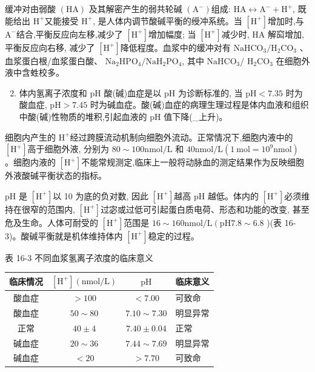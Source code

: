 \documentclass[10pt]{article}
\begin{document}
缓冲对由弱酸 $(\mathrm{HA})$ 及其解密产生的弱共轮碱 $\left(\mathrm{A}^{-}\right)$组成: $\mathrm{HA} \leftrightarrow \mathrm{A}^{-}+\mathrm{H}^{+}$, 既能给出 $\mathrm{H}^{+}$又能接受 $\mathrm{H}^{+}$, 是人体内调节酸碱平衡的绶冲系统。当 $\left[\mathrm{H}^{+}\right]$增加时,与 $\mathrm{A}^{-}$结合,平衡反应向左移,减少了 $\left[\mathrm{H}^{+}\right]$增加幅度; 当 $\left[\mathrm{H}^{+}\right]$减少时, $\mathrm{HA}$ 解䆗增加, 平衡反应向右移, 减少了 $\left[\mathrm{H}^{+}\right]$降低程度。血浆中的缓冲对有 $\mathrm{NaHCO}_{3} / \mathrm{H}_{2} \mathrm{CO}_{3}$ 、血浆蛋白根/血浆蛋白酸、 $\mathrm{Na}_{2} \mathrm{HPO}_{4} / \mathrm{NaH}_{2} \mathrm{PO}_{4}$, 其中 $\mathrm{NaHCO}_{3} /$ $\mathrm{H}_{2} \mathrm{CO}_{3}$ 在细胞外液中含﨡校多。

\begin{enumerate}
  \setcounter{enumi}{1}
  \item 体内氢离子浓度和 $\mathrm{pH}$ 酸(碱)血症是以 $\mathrm{pH}$ 为诊断标准的, 当 $\mathrm{pH}<7.35$ 时为酸血症, $\mathrm{pH}>7.45$ 时为碱血症。酸(碱)血症的病理生理过程是体内血液和组织中酸(碱)性物质的堆积,引起血液的 $\mathrm{pH}$ 值下降(\_上升)。
\end{enumerate}

细胞内产生的 $\mathrm{H}^{+}$经过跨膜流动机制向细胞外流动。正常情况下,细胞内液中的 $\left[\mathrm{H}^{+}\right]$高于细胞外液, 分别为 $80 \sim 100 \mathrm{nmol} / \mathrm{L}$ 和 $40 \mathrm{nmol} / \mathrm{L}\left(1 \mathrm{~mol}=10^{9} \mathrm{nmol}\right)$ 。细胞内液的 $\left[\mathrm{H}^{+}\right]$不能常规测定,临床上一般将动脉血的测定结果作为反映细胞外液酸碱平衡状态的指标。

$\mathrm{pH}$ 是 $\left[\mathrm{H}^{+}\right]$以 10 为底的负对数, 因此 $\left[\mathrm{H}^{+}\right]$越高 $\mathrm{pH}$ 越低。体内的 $\left[\mathrm{H}^{+}\right]$必须维持在很窄的范围内, $\left[\mathrm{H}^{+}\right]$过宓或过低可引起蛋白质电荷、形态和功能的改变, 甚至危及生命。人体可耐受的 $\left[\mathrm{H}^{+}\right]$范围是 $16 \sim 160 \mathrm{nmol} / \mathrm{L}\left(\mathrm{pH} 7.8 \sim 6.8\right.$ )(表 16-3)。酸碱平衡就是机体维持体内 $\left[\mathrm{H}^{+}\right]$稳定的过程。

表 16-3 不同血浆氢离子浓度的临床意义

\begin{center}
\begin{tabular}{cccl}
\hline
临床情况 & $\left[\mathrm{H}^{+}\right](\mathrm{nmol} / \mathrm{L})$ & $\mathrm{pH}$ & 临床意义 \\
\hline
酸血症 & $>100$ & $<7.00$ & 可致命 \\
酸血症 & $50 \sim 80$ & $7.10 \sim 7.30$ & 明显异常 \\
正常 & $40 \pm 4$ & $7.40 \pm 0.04$ & 正常 \\
碱血症 & $20 \sim 36$ & $7.44 \sim 7.69$ & 明显异常 \\
碱血症 & $<20$ & $>7.70$ & 可致命 \\
\hline
\end{tabular}
\end{center}
\end{document}
